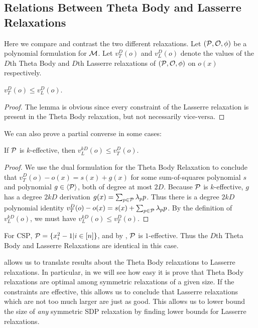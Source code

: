 \subsection{Relations Between Theta Body and Lasserre Relaxations}
Here we compare and contrast the two different relaxations. Let $(\mathcal P, \mathcal O, \phi)$ be a polynomial formulation for $\mathcal M$. Let $v_T^D(o)$ and $v_L^D(o)$ denote the values of the $D$th Theta Body and $D$th Lasserre relaxations of $(\mathcal P, \mathcal O, \phi)$ on $o(x)$ respectively.
\begin{lemma}
$v_T^D(o) \leq v_L^D(o)$.
\end{lemma}
\begin{proof}
The lemma is obvious since every constraint of the Lasserre relaxation is present in the Theta Body relaxation, but not necessarily vice-versa.
\end{proof}
We can also prove a partial converse in some cases:
\begin{proposition}\label{prop:tb_to_sos}
If $\mathcal P$ is $k$-effective, then $v_L^{kD}(o) \leq v_T^D(o)$.
\end{proposition}
\begin{proof}
We use the dual formulation for the Theta Body Relaxation to conclude that $v_T^D(o) - o(x) = s(x) + g(x)$ for some sum-of-squares polynomial $s$ and polynomial $g \in \langle \mathcal P \rangle$, both of degree at most $2D$. Because $\mathcal P$ is $k$-effective, $g$ has a degree $2kD$ derivation $g(x) = \sum_{p \in \mathcal P} \lambda_p p$. Thus there is a degree $2kD$ polynomial identity $v_T^D(o) - o(x) = s(x) + \sum_{p \in \mathcal P} \lambda_p p$. By the definition of $v_L^{kD}(o)$, we must have $v_L^{kD}(o) \leq v_T^D(o)$.
\end{proof}
\begin{example}
For \textsc{CSP}, $\mathcal P = \{x_i^2 - 1 | i \in [n]\}$, and by , $\mathcal P$ is $1$-effective. Thus the $D$th Theta Body and Lasserre Relaxations are identical in this case.
\end{example}
 allows us to translate results about the Theta Body relaxations to Lasserre relaxations. In particular, in  we will see how easy it is prove that Theta Body relaxations are optimal among symmetric relaxations of a given size. If the constraints are effective, this allows us to conclude that Lasserre relaxations which are not too much larger are just as good. This allows us to lower bound the size of \emph{any} symmetric SDP relaxation by finding lower bounds for Lasserre relaxations. 


